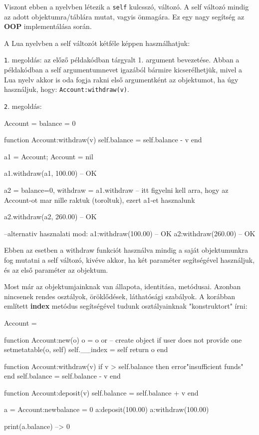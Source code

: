 Viszont ebben a nyelvben létezik a \texttt{self} kulcsszó, változó. A self változó mindig az adott objektumra/táblára mutat, vagyis önmagára. Ez egy nagy segítség az \textbf{OOP} implementálása során.

A Lua nyelvben a self változót kétféle képpen használhatjuk:

\hspace{10mm}\texttt{1}. megoldás: az előző példakódban tárgyalt 1. argument bevezetése. Abban a példakódban a self argumentumnevet igazából bármire kicserélhetjük, mivel a Lua nyelv akkor is oda fogja rakni első argumentként az objektumot, ha úgy használjuk, hogy: \texttt{Account:withdraw(v)}.

\hspace{10mm}\texttt{2}. megoldás:
\begin{lua}
Account = {balance = 0}

function Account:withdraw(v)
	self.balance = self.balance - v
end

a1 = Account; Account = nil

a1.withdraw(a1, 100.00)   -- OK

a2 = {balance=0, withdraw = a1.withdraw} -- itt figyelni kell arra, hogy az Account-ot mar nille raktuk (toroltuk), ezert a1-et hasznalunk 

a2.withdraw(a2, 260.00) -- OK

--alternativ hasznalati mod:
a1:withdraw(100.00) -- OK
a2:withdraw(260.00) -- OK
\end{lua}
Ebben az esetben a withdraw funkciót használva mindig a saját objektumunkra fog mutatni a self változó, kivéve akkor, ha két paraméter segítségével használjuk, és az első paraméter az objektum.

Most már az objektumjainknak van állapota, identitása, metódusai. Azonban nincsenek rendes osztályok, öröklődések, láthatósági szabályok.\pagebreak
{}
A korábban említett \detokenize{__}\textbf{index} metódus segítségével tudunk osztályainknak "konstruktort" írni:
\begin{lua}
Account = {}

function Account:new(o)
	o = o or {}   -- create object if user does not provide one
	setmetatable(o, self)
	self.__index = self
	return o
end

function Account:withdraw(v)
	if v > self.balance then error"insufficient funds" end
	self.balance = self.balance - v
end

function Account:deposit(v)
	self.balance = self.balance + v
end

a = Account:new{balance = 0}
a:deposit(100.00)
a:withdraw(100.00)

print(a.balance) --> 0
\end{lua}

